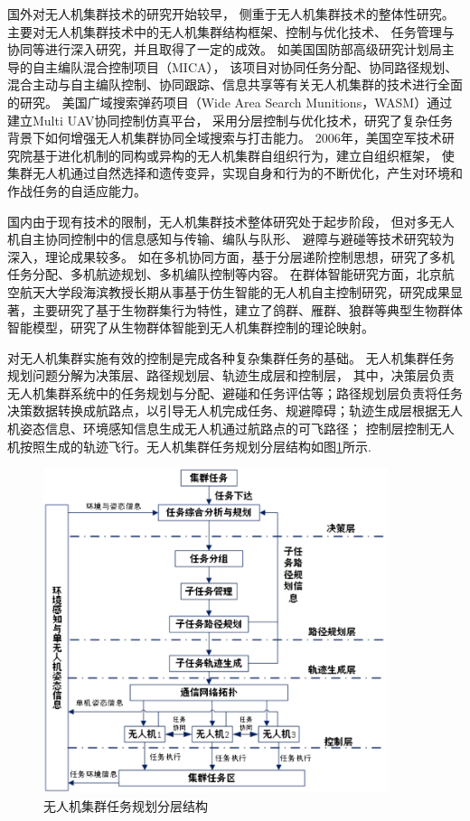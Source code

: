 国外对无人机集群技术的研究开始较早，
侧重于无人机集群技术的整体性研究。主要对无人机集群技术中的无人机集群结构框架、控制与优化技术、
任务管理与协同等进行深入研究，并且取得了一定的成效。
如美国国防部高级研究计划局主导的自主编队混合控制项目（MICA），
该项目对协同任务分配、协同路径规划、混合主动与自主编队控制、协同跟踪、信息共享等有关无人机集群的技术进行全面的研究。
美国广域搜索弹药项目（Wide Area Search Munitions，WASM）通过建立Multi UAV协同控制仿真平台，
采用分层控制与优化技术，研究了复杂任务背景下如何增强无人机集群协同全域搜索与打击能力。
2006年，美国空军技术研究院基于进化机制的同构或异构的无人机集群自组织行为，建立自组织框架，
使集群无人机通过自然选择和遗传变异，实现自身和行为的不断优化，产生对环境和作战任务的自适应能力。
\par
国内由于现有技术的限制，无人机集群技术整体研究处于起步阶段，
但对多无人机自主协同控制中的信息感知与传输、编队与队形、
避障与避碰等技术研究较为深入，理论成果较多。
如在多机协同方面，基于分层递阶控制思想，研究了多机任务分配、多机航迹规划、多机编队控制等内容。
在群体智能研究方面，北京航空航天大学段海滨教授长期从事基于仿生智能的无人机自主控制研究，研究成果显著，主要研究了基于生物群集行为特性，建立了鸽群、雁群、狼群等典型生物群体智能模型，研究了从生物群体智能到无人机集群控制的理论映射。

\par
对无人机集群实施有效的控制是完成各种复杂集群任务的基础。
无人机集群任务规划问题分解为决策层、路径规划层、轨迹生成层和控制层，
其中，决策层负责无人机集群系统中的任务规划与分配、避碰和任务评估等；路径规划层负责将任务决策数据转换成航路点，以引导无人机完成任务、规避障碍；轨迹生成层根据无人机姿态信息、环境感知信息生成无人机通过航路点的可飞路径；
控制层控制无人机按照生成的轨迹飞行。无人机集群任务规划分层结构如图\ref{struct_1}所示. 
\begin{figure}[htpb]
    \centering
    \includegraphics[width=0.9\textwidth]{pictures/formationStruct_1.png}
    \caption{无人机集群任务规划分层结构}
    \label{struct_1}
\end{figure}